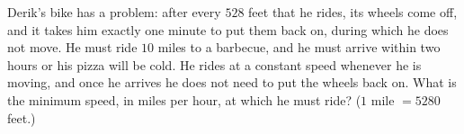 Derik's bike has a problem: after every $528$ feet that he rides, its wheels come off, and it takes him exactly one minute to put them back on, during which he does not move. He must ride $10$ miles to a barbecue, and he must arrive within two hours or his pizza will be cold. He rides at a constant speed whenever he is moving, and once he arrives he does not need to put the wheels back on. What is the minimum speed, in miles per hour, at which he must ride? ($1$ mile $=5280$ feet.)
